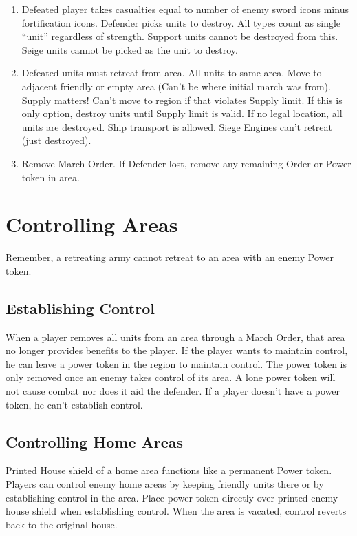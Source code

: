 \documentclass[10pt]{article}
\newenvironment{enumerateCustom}
{\begin{enumerate}
  \setlength{\itemsep}{1pt}
  \setlength{\parskip}{0pt}
  \setlength{\parsep}{0pt}}
{\end{enumerate}}
\begin{document}
\begin{multicols*}{2}
\begin{enumerateCustom}
\begin{enumerateCustom}
		\item Defeated player takes casualties equal to number of enemy sword icons minus fortification icons. Defender picks units to destroy. All types count as single ``unit'' regardless of strength. Support units cannot be destroyed from this. Seige units cannot be picked as the unit to destroy.
		\item Defeated units must retreat from area. All units to same area. Move to adjacent friendly or empty area (Can't be where initial march was from). Supply matters! Can't move to region if that violates Supply limit. If this is only option, destroy units until Supply limit is valid. If no legal location, all units are destroyed. Ship transport is allowed. Siege Engines can't retreat (just destroyed).
		\item Remove March Order. If Defender lost, remove any remaining Order or Power token in area.
	\end{enumerateCustom}
\end{enumerateCustom}

\section*{Controlling Areas}
Remember, a retreating army cannot retreat to an area with an enemy Power token.
\subsection*{Establishing Control}
When a player removes all units from an area through a March Order, that area no longer provides benefits to the player. If the player wants to maintain control, he can leave a power token in the region to maintain control. The power token is only removed once an enemy takes control of its area. A lone power token will not cause combat nor does it aid the defender. If a player doesn't have a power token, he can't establish control.
\subsection*{Controlling Home Areas}
Printed House shield of a home area functions like a permanent Power token. Players can control enemy home areas by keeping friendly units there or by establishing control in the area. Place power token directly over printed enemy house shield when establishing control. When the area is vacated, control reverts back to the original house.


\end{multicols*}
\end{document}
